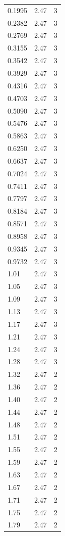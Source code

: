 \begin{longtable}{lrr}
  0.1995 & 2.47 & 3 \\
  0.2382 & 2.47 & 3 \\
  0.2769 & 2.47 & 3 \\
  0.3155 & 2.47 & 3 \\
  0.3542 & 2.47 & 3 \\
  0.3929 & 2.47 & 3 \\
  0.4316 & 2.47 & 3 \\
  0.4703 & 2.47 & 3 \\
  0.5090 & 2.47 & 3 \\
  0.5476 & 2.47 & 3 \\
  0.5863 & 2.47 & 3 \\
  0.6250 & 2.47 & 3 \\
  0.6637 & 2.47 & 3 \\
  0.7024 & 2.47 & 3 \\
  0.7411 & 2.47 & 3 \\
  0.7797 & 2.47 & 3 \\
  0.8184 & 2.47 & 3 \\
  0.8571 & 2.47 & 3 \\
  0.8958 & 2.47 & 3 \\
  0.9345 & 2.47 & 3 \\
  0.9732 & 2.47 & 3 \\
  1.01 & 2.47 & 3 \\
  1.05 & 2.47 & 3 \\
  1.09 & 2.47 & 3 \\
  1.13 & 2.47 & 3 \\
  1.17 & 2.47 & 3 \\
  1.21 & 2.47 & 3 \\
  1.24 & 2.47 & 3 \\
  1.28 & 2.47 & 3 \\
  1.32 & 2.47 & 2 \\
  1.36 & 2.47 & 2 \\
  1.40 & 2.47 & 2 \\
  1.44 & 2.47 & 2 \\
  1.48 & 2.47 & 2 \\
  1.51 & 2.47 & 2 \\
  1.55 & 2.47 & 2 \\
  1.59 & 2.47 & 2 \\
  1.63 & 2.47 & 2 \\
  1.67 & 2.47 & 2 \\
  1.71 & 2.47 & 2 \\
  1.75 & 2.47 & 2 \\
  1.79 & 2.47 & 2 \\

\end{longtable}
